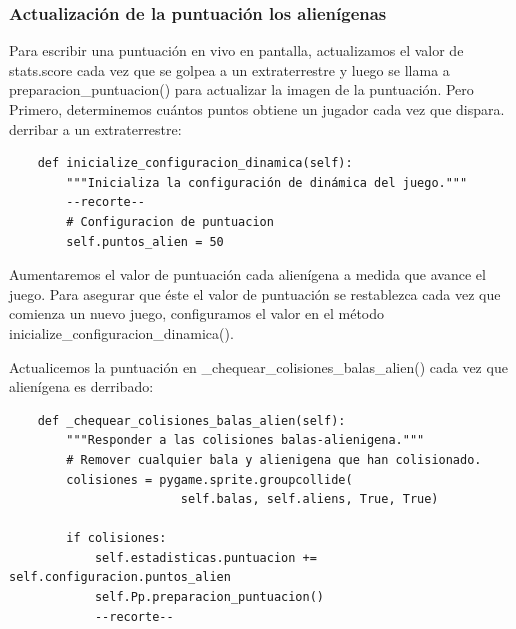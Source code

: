 \subsubsection{Actualización de la puntuación los alienígenas}

Para escribir una puntuación en vivo en pantalla, actualizamos el valor de stats.score cada vez que
se golpea a un extraterrestre y luego se llama a {\ttfamily preparacion\_puntuacion()} para actualizar la imagen de la puntuación. Pero
Primero, determinemos cuántos puntos obtiene un jugador cada vez que dispara.
derribar a un extraterrestre:

\hspace{-2.75cm}{\ttfamily \scriptsize configurar.py}  \vspace{-0.5cm}
\begin{lstlisting}	
    def inicialize_configuracion_dinamica(self):
        """Inicializa la configuración de dinámica del juego."""
        --recorte--
        # Configuracion de puntuacion
        self.puntos_alien = 50
\end{lstlisting}

Aumentaremos el valor de puntuación cada alienígena a medida que avance el juego. Para asegurar que éste el valor de puntuación  se restablezca cada vez que comienza un nuevo juego, configuramos el valor en el método {\ttfamily inicialize\_configuracion\_dinamica()}.

Actualicemos la puntuación en {\ttfamily \_chequear\_colisiones\_balas\_alien()} cada vez que
alienígena es derribado:

\hspace{-2.4cm}{\ttfamily \scriptsize invasión}

\vspace{-0.2cm}
\hspace{-2.1cm}{\ttfamily \scriptsize \_alien.py}\vspace{-0.84cm}
\begin{lstlisting}       
    def _chequear_colisiones_balas_alien(self):
        """Responder a las colisiones balas-alienigena."""
        # Remover cualquier bala y alienigena que han colisionado.
        colisiones = pygame.sprite.groupcollide(
                        self.balas, self.aliens, True, True)

        if colisiones:
            self.estadisticas.puntuacion += self.configuracion.puntos_alien 
            self.Pp.preparacion_puntuacion()
            --recorte--  
\end{lstlisting}

